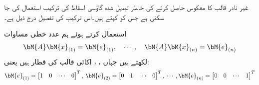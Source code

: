 غیر نادر  قالب   کا معکوس حاصل  کرنے کی خاطر تبدیل شدہ  گاؤسی اسقاط کی ترکیب استعمال کی جا سکتی ہے جس کو  کہتے ہیں۔اس ترکیب کی تفصیل درج ذیل ہے۔

 استعمال کرتے ہوئے ہم  عدد خطی مساوات
\begin{align*}
\bM{A}\bM{x}_{(1)}=\bM{e}_{(1)},\quad \cdots,\quad  \bM{A}\bM{x}_{(n)}=\bM{e}_{(n)}
\end{align*}
لکھتے ہیں جہاں ، ،  اکائی  قالب  کی قطار ہیں یعنی:
\begin{align*}
\bM{e}_{(1)}=\begin{bmatrix}1&0&\cdots&0\end{bmatrix}^T,\, \bM{e}_{(2)}=\begin{bmatrix}0&1&\cdots&0\end{bmatrix}^T,\, \cdots,\bM{e}_{(n)}=\begin{bmatrix}0&0&\cdots&1\end{bmatrix}^T
\end{align*} 
